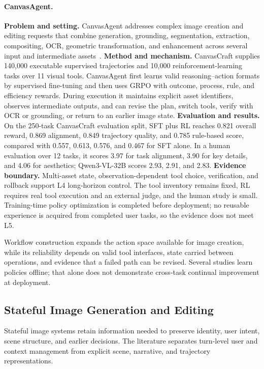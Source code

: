 \paragraph{CanvasAgent.}
\textbf{Problem and setting.} CanvasAgent addresses complex image creation and editing requests that combine generation, grounding, segmentation, extraction, compositing, OCR, geometric transformation, and enhancement across several input and intermediate assets~\cite{avg260705465}. \textbf{Method and mechanism.} CanvasCraft supplies 140,000 executable supervised trajectories and 10,000 reinforcement-learning tasks over 11 visual tools. CanvasAgent first learns valid reasoning--action formats by supervised fine-tuning and then uses GRPO with outcome, process, rule, and efficiency rewards. During execution it maintains explicit asset identifiers, observes intermediate outputs, and can revise the plan, switch tools, verify with OCR or grounding, or return to an earlier image state. \textbf{Evaluation and results.} On the 250-task CanvasCraft evaluation split, SFT plus RL reaches 0.821 overall reward, 0.869 alignment, 0.849 trajectory quality, and 0.785 rule-based score, compared with 0.557, 0.613, 0.576, and 0.467 for SFT alone. In a human evaluation over 12 tasks, it scores 3.97 for task alignment, 3.90 for key details, and 4.06 for aesthetics; Qwen3-VL-32B scores 2.93, 2.91, and 2.83. \textbf{Evidence boundary.} Multi-asset state, observation-dependent tool choice, verification, and rollback support L4 long-horizon control. The tool inventory remains fixed, RL requires real tool execution and an external judge, and the human study is small. Training-time policy optimization is completed before deployment; no reusable experience is acquired from completed user tasks, so the evidence does not meet L5.

Workflow construction expands the action space available for image creation, while its reliability depends on valid tool interfaces, state carried between operations, and evidence that a failed path can be revised. Several studies learn policies offline; that alone does not demonstrate cross-task continual improvement at deployment.

\subsection{Stateful Image Generation and Editing}
Stateful image systems retain information needed to preserve identity, user intent, scene structure, and earlier decisions. The literature separates turn-level user and context management from explicit scene, narrative, and trajectory representations.

